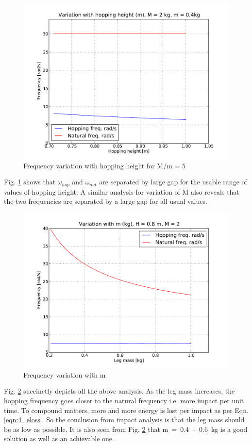 \begin{figure}[!h]
\centering
\includegraphics[scale=0.6]{fig/freq_hopheight.pdf}
\caption{Frequency variation with hopping height for M/m = 5}
\label{fig:4_freq_height}
\end{figure}
Fig. \ref{fig:4_freq_height} shows that $\omega_{hop}$ and $\omega_{nat}$ are separated by large gap for the usable range
of values of hopping height. A similar analysis for variation of M also reveals that the two frequencies are separated
by a large gap for all usual values.
\begin{figure}[!h]
\centering
\includegraphics[scale=0.6]{fig/freq_m.pdf}
\caption{Frequency variation with m}
\label{fig:4_freq_m}
\end{figure}
Fig. \ref{fig:4_freq_m} succinctly depicts all the above analysis. As the leg mass increases, the hopping frequency goes
closer to the natural frequency i.e. more impact per unit time. To compound matters, more and more energy is lost per impact
as per Eqn. \ref{eqn:4_eloss}. So the conclusion from impact analysis is that the leg mass should be as low as possible. It is also
seen from Fig. \ref{fig:4_freq_m} that \mbox{m = 0.4 -- 0.6 kg} is a good solution as well as an achievable one. 


